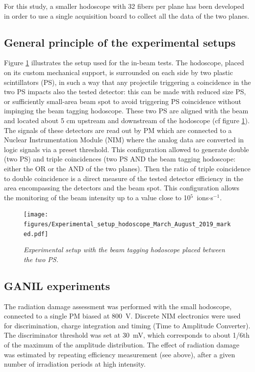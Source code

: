 \documentclass[a4paper,11pt]{article}
\begin{document}
For this study, a smaller hodoscope with 32 fibers per plane has been developed in order to use a single acquisition board to collect all the data of the two planes.


\subsection{General principle of the experimental setups}

Figure \ref{fig:Picture_Setup_hodo} illustrates the setup used for the in-beam tests.
The hodoscope, placed on its custom mechanical support, is surrounded on each side by two plastic scintillators (PS), in such a way that any projectile triggering a coincidence in the two PS impacts also the tested detector: this can be made with reduced size PS, or sufficiently small-area beam spot to avoid triggering PS coincidence without impinging the beam tagging hodoscope. These two PS are aligned with the beam and located about 5 cm upstream and downstream of the hodoscope (cf figure \ref{fig:Picture_Setup_hodo}). The signals of these detectors are read out by PM which are connected to a Nuclear Instrumentation Module (NIM) where the analog data are converted in logic signals via a preset threshold. This configuration allowed to generate double (two PS) and triple coincidences (two PS AND the beam tagging hodoscope: either the OR or the AND of the two planes). Then the ratio of triple coincidence to double coincidence is a direct measure of the tested detector efficiency in the area encompassing the detectors and the beam spot. This configuration allows the monitoring of the beam intensity up to a value close to {10}$^{5}$~ions$\cdot$s$^{-1}$.

\begin{figure}[htb]
\centering
\texttt{[image: figures/Experimental\_setup\_hodoscope\_March\_August\_2019\_marked.pdf]}
\caption{\small{\textit{Experimental setup with the beam tagging hodoscope placed between the two PS.}}}
\label{fig:Picture_Setup_hodo}
\end{figure}


\subsection{GANIL experiments}

The radiation damage assessment was performed with the small hodoscope, connected to a single PM biased at 800~V. Discrete NIM electronics were used for discrimination, charge integration and timing (Time to Amplitude Converter). The discriminator threshold was set at 30~mV, which corresponds to about 1/6th of the maximum of the amplitude distribution. The effect of radiation damage was estimated by repeating efficiency measurement (see above), after a given number of irradiation periods at high intensity.
\end{document}
